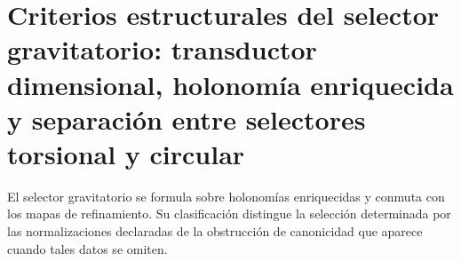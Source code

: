\chapter{Criterios estructurales del selector gravitatorio: transductor dimensional, holonomía enriquecida y separación entre selectores torsional y circular}
\label{chap:parte-iv-66}
El selector gravitatorio se formula sobre holonomías enriquecidas y conmuta
con los mapas de refinamiento. Su clasificación distingue la selección
determinada por las normalizaciones declaradas de la obstrucción de
canonicidad que aparece cuando tales datos se omiten.

\begingroup
\let\HMTOwnerSection\section
\let\HMTOwnerSubsection\subsection
\let\HMTOwnerSubsubsection\subsubsection
\let\HMTOwnerParagraph\paragraph
\let\chapter\HMTOwnerSection
\let\section\HMTOwnerSubsection
\let\subsection\HMTOwnerSubsubsection
\let\subsubsection\HMTOwnerParagraph

\endgroup
\begingroup
\let\HMTOwnerSection\section
\let\HMTOwnerSubsection\subsection
